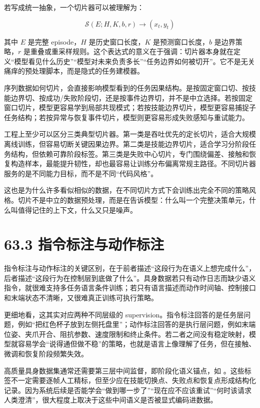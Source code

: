 若写成统一抽象，一个切片器可以被理解为：

\begin{equation*}
\mathcal{S}(E; H, K, b, r) \rightarrow (x_t, y_t)
\end{equation*}

其中 \(E\) 是完整 episode，\(H\) 是历史窗口长度，\(K\) 是预测窗口长度，\(b\) 是边界策略，\(r\) 是重叠或重采样规则。这个表达式的意义在于强调：切片器本身就在定义“模型看见什么历史”“模型对未来负责多长”“任务边界如何被切开”。它不是无关痛痒的预处理脚本，而是隐式的任务建模器。

序列数据如何切片，会直接影响模型看到的任务因果结构。是按固定窗口切、按技能边界切、按成功/失败阶段切，还是按事件边界切，并不是中立选择。若按固定窗口切片，模型更容易学到局部共现模式；若按技能边界切片，模型更容易捕捉子任务结构；若按异常与恢复事件切片，模型则更容易形成失败感知与重试能力。

工程上至少可以区分三类典型切片器。第一类是吞吐优先的定长切片，适合大规模离线训练，但容易切断关键因果边界。第二类是技能边界切片，适合学习分阶段任务结构，但依赖可靠阶段标签。第三类是失败中心切片，专门围绕偏差、接触和恢复构造样本，最能提升韧性，却也最容易让训练分布偏离常规主路径。不同切片器服务的是不同能力目标，而不是不同“代码风格”。

这也是为什么许多看似相似的数据，在不同切片方式下会训练出完全不同的策略风格。切片不是中立的数据预处理，而是在告诉模型：什么叫一个完整决策单元，什么叫值得记住的上下文，什么又只是噪声。

\section*{63.3 指令标注与动作标注}


指令标注与动作标注的关键区别，在于前者描述“这段行为在语义上想完成什么”，后者描述“这段行为在控制层到底做了什么”。具身数据若只有动作日志而缺少语义指令，就很难支持多任务语言条件训练；若只有语言描述而动作时间轴、控制接口和末端状态不清晰，又很难真正训练可执行策略。

更细地看，这其实对应两种不同层级的 supervision。指令标注回答的是任务层问题，例如“把红色杯子放到左侧托盘里”；动作标注回答的是执行层问题，例如末端位姿、夹爪开合、阻抗参数、速度限制和终止条件。若二者之间没有稳定映射，模型就容易学会“说得通但做不稳”的策略，也就是语言上像理解了任务，但在接触、微调和恢复阶段频繁失效。

高质量具身数据集通常还需要第三层中间监督，即阶段化语义锚点，如 \texttt{}。这些标签不一定需要逐帧人工精标，但至少应在技能切换点、失败点和恢复点形成结构化记录。因为系统后续是否能学会“做到哪一步了”“现在应不应该重试”“何时该请求人类澄清”，很大程度上取决于这些中间语义是否被显式编码进数据。

